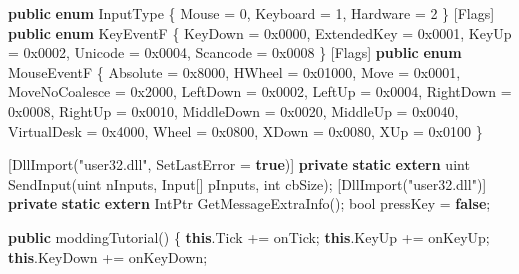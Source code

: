 \documentclass[
  openany]{book}
\newenvironment{Shaded}{\begin{snugshade}}{\end{snugshade}}
\newcommand{\BaseNTok}[1]{\textcolor[rgb]{0.00,0.00,0.81}{#1}}
\newcommand{\DataTypeTok}[1]{\textcolor[rgb]{0.13,0.29,0.53}{#1}}
\newcommand{\DecValTok}[1]{\textcolor[rgb]{0.00,0.00,0.81}{#1}}
\newcommand{\FunctionTok}[1]{\textcolor[rgb]{0.00,0.00,0.00}{#1}}
\newcommand{\KeywordTok}[1]{\textcolor[rgb]{0.13,0.29,0.53}{\textbf{#1}}}
\newcommand{\NormalTok}[1]{#1}
\newcommand{\StringTok}[1]{\textcolor[rgb]{0.31,0.60,0.02}{#1}}
\begin{document}
\begin{Shaded}
\begin{Highlighting}[]
        \KeywordTok{public} \KeywordTok{enum}\NormalTok{ InputType}
\NormalTok{        \{}
\NormalTok{            Mouse = }\DecValTok{0}\NormalTok{,}
\NormalTok{            Keyboard = }\DecValTok{1}\NormalTok{,}
\NormalTok{            Hardware = }\DecValTok{2}
\NormalTok{        \}}
\NormalTok{        [Flags]}
        \KeywordTok{public} \KeywordTok{enum}\NormalTok{ KeyEventF}
\NormalTok{        \{}
\NormalTok{            KeyDown = }\BaseNTok{0x0000}\NormalTok{,}
\NormalTok{            ExtendedKey = }\BaseNTok{0x0001}\NormalTok{,}
\NormalTok{            KeyUp = }\BaseNTok{0x0002}\NormalTok{,}
\NormalTok{            Unicode = }\BaseNTok{0x0004}\NormalTok{,}
\NormalTok{            Scancode = }\BaseNTok{0x0008}
\NormalTok{        \}}
\NormalTok{        [Flags]}
        \KeywordTok{public} \KeywordTok{enum}\NormalTok{ MouseEventF}
\NormalTok{        \{}
\NormalTok{            Absolute = }\BaseNTok{0x8000}\NormalTok{,}
\NormalTok{            HWheel = }\BaseNTok{0x01000}\NormalTok{,}
\NormalTok{            Move = }\BaseNTok{0x0001}\NormalTok{,}
\NormalTok{            MoveNoCoalesce = }\BaseNTok{0x2000}\NormalTok{,}
\NormalTok{            LeftDown = }\BaseNTok{0x0002}\NormalTok{,}
\NormalTok{            LeftUp = }\BaseNTok{0x0004}\NormalTok{,}
\NormalTok{            RightDown = }\BaseNTok{0x0008}\NormalTok{,}
\NormalTok{            RightUp = }\BaseNTok{0x0010}\NormalTok{,}
\NormalTok{            MiddleDown = }\BaseNTok{0x0020}\NormalTok{,}
\NormalTok{            MiddleUp = }\BaseNTok{0x0040}\NormalTok{,}
\NormalTok{            VirtualDesk = }\BaseNTok{0x4000}\NormalTok{,}
\NormalTok{            Wheel = }\BaseNTok{0x0800}\NormalTok{,}
\NormalTok{            XDown = }\BaseNTok{0x0080}\NormalTok{,}
\NormalTok{            XUp = }\BaseNTok{0x0100}
\NormalTok{        \}}


\NormalTok{        [}\FunctionTok{DllImport}\NormalTok{(}\StringTok{"user32.dll"}\NormalTok{, SetLastError = }\KeywordTok{true}\NormalTok{)]}
        \KeywordTok{private} \KeywordTok{static} \KeywordTok{extern} \DataTypeTok{uint} \FunctionTok{SendInput}\NormalTok{(}\DataTypeTok{uint}\NormalTok{ nInputs, Input[] pInputs, }\DataTypeTok{int}\NormalTok{ cbSize);}
\NormalTok{        [}\FunctionTok{DllImport}\NormalTok{(}\StringTok{"user32.dll"}\NormalTok{)]}
        \KeywordTok{private} \KeywordTok{static} \KeywordTok{extern}\NormalTok{ IntPtr }\FunctionTok{GetMessageExtraInfo}\NormalTok{();}
        \DataTypeTok{bool}\NormalTok{ pressKey = }\KeywordTok{false}\NormalTok{;}

        \KeywordTok{public} \FunctionTok{moddingTutorial}\NormalTok{()}
\NormalTok{        \{}
            \KeywordTok{this}\NormalTok{.}\FunctionTok{Tick}\NormalTok{ += onTick;}
            \KeywordTok{this}\NormalTok{.}\FunctionTok{KeyUp}\NormalTok{ += onKeyUp;}
            \KeywordTok{this}\NormalTok{.}\FunctionTok{KeyDown}\NormalTok{ += onKeyDown;}



\end{Highlighting}
\end{Shaded}
\end{document}
